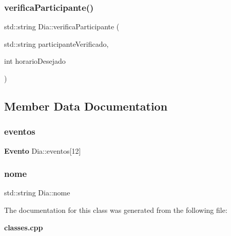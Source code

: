 \mbox{\label{class_dia_a89bd31c85f36ad37eaba9e5712494ac8}} 
\subsubsection{verifica\+Participante()}
{\footnotesize\ttfamily std\+::string Dia\+::verifica\+Participante (\begin{DoxyParamCaption}\item[{std\+::string}]{participante\+Verificado,  }\item[{int}]{horario\+Desejado }\end{DoxyParamCaption})\hspace{0.3cm}{\ttfamily [inline]}}



\subsection{Member Data Documentation}
\mbox{\label{class_dia_a504eadf333e198eb440acf28c27bddc9}} 
\subsubsection{eventos}
{\footnotesize\ttfamily \textbf{ Evento} Dia\+::eventos[12]}

\mbox{\label{class_dia_a637e54ca45f352ec7f042029fb420c43}} 
\subsubsection{nome}
{\footnotesize\ttfamily std\+::string Dia\+::nome}



The documentation for this class was generated from the following file\+:\begin{DoxyCompactItemize}
\item 
\textbf{ classes.\+cpp}\end{DoxyCompactItemize}
